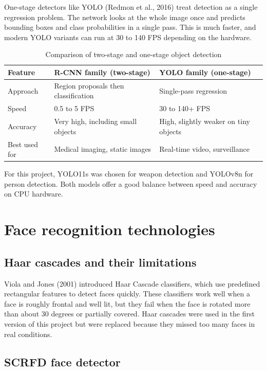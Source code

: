\documentclass[12pt,a4paper]{report}
\begin{document}
One-stage detectors like YOLO (Redmon et al., 2016) treat detection as a single regression problem. The network looks at the whole image once and predicts bounding boxes and class probabilities in a single pass. This is much faster, and modern YOLO variants can run at 30 to 140 FPS depending on the hardware.

\begin{table}[htbp]
\centering
\begin{tabular}{|l|p{5cm}|p{5cm}|}
\hline
\textbf{Feature} & \textbf{R-CNN family (two-stage)} & \textbf{YOLO family (one-stage)} \\
\hline
Approach & Region proposals then classification & Single-pass regression \\
\hline
Speed & 0.5 to 5 FPS & 30 to 140+ FPS \\
\hline
Accuracy & Very high, including small objects & High, slightly weaker on tiny objects \\
\hline
Best used for & Medical imaging, static images & Real-time video, surveillance \\
\hline
\end{tabular}
\caption{Comparison of two-stage and one-stage object detection}
\label{tab:detector_comparison}
\end{table}

For this project, YOLO11s was chosen for weapon detection and YOLOv8n for person detection. Both models offer a good balance between speed and accuracy on CPU hardware.

\section{Face recognition technologies}

\subsection{Haar cascades and their limitations}

Viola and Jones (2001) introduced Haar Cascade classifiers, which use predefined rectangular features to detect faces quickly. These classifiers work well when a face is roughly frontal and well lit, but they fail when the face is rotated more than about 30 degrees or partially covered. Haar cascades were used in the first version of this project but were replaced because they missed too many faces in real conditions.

\subsection{SCRFD face detector}
\end{document}
